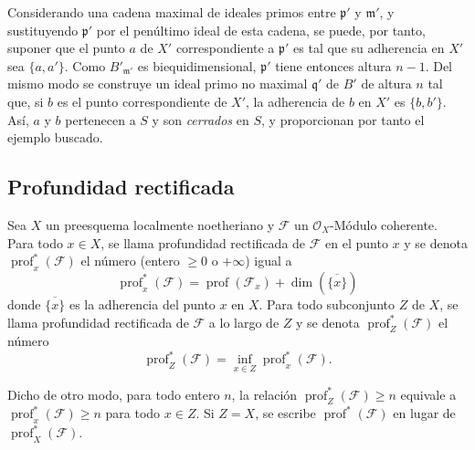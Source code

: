 \begin{env}[10.7.3]
Considerando una cadena maximal de ideales primos entre $\mathfrak p'$ y $\mathfrak m'$, y sustituyendo $\mathfrak p'$ por el penúltimo ideal de esta cadena, se puede, por tanto, suponer que el punto $a$ de $X'$ correspondiente a $\mathfrak p'$ es tal que su adherencia en $X'$ sea $\{a,a'\}$.
Como $B'_{\mathfrak m'}$ es biequidimensional, $\mathfrak p'$ tiene entonces altura $n-1$.
Del mismo modo se construye un ideal primo no maximal $\mathfrak q'$ de $B'$ de altura $n$ tal que, si $b$ es el punto correspondiente de $X'$, la adherencia de $b$ en $X'$ es $\{b,b'\}$.
Así, $a$ y $b$ pertenecen a $S$ y son \emph{cerrados} en $S$, y proporcionan por tanto el ejemplo buscado.
\end{env}

\subsection{Profundidad rectificada}
\label{subsection:IV.10.8}

\begin{definition}[10.8.1]
\label{IV.10.8.1}
Sea $X$ un preesquema localmente noetheriano y $\mathcal F$ un $\mathcal O_X$-Módulo coherente.
Para todo $x\in X$, se llama profundidad rectificada de $\mathcal F$ en el punto $x$ y se denota $\operatorname{prof}^{*}_{x}(\mathcal F)$ el número (entero $\geq0$ o $+\infty$) igual a
\begin{equation}
\label{IV.10.8.1.1-fr}
\tag{10.8.1.1}
\operatorname{prof}^{*}_{x}(\mathcal F)
=\operatorname{prof}(\mathcal F_x)+\dim(\overline{\{x\}})
\end{equation}
donde $\overline{\{x\}}$ es la adherencia del punto $x$ en $X$.
Para todo subconjunto $Z$ de $X$, se llama profundidad rectificada de $\mathcal F$ a lo largo de $Z$ y se denota $\operatorname{prof}^{*}_{Z}(\mathcal F)$ el número
\begin{equation}
\label{IV.10.8.1.2-fr}
\tag{10.8.1.2}
\operatorname{prof}^{*}_{Z}(\mathcal F)
=\inf_{x\in Z}\operatorname{prof}^{*}_{x}(\mathcal F).
\end{equation}
\end{definition}

Dicho de otro modo, para todo entero $n$, la relación $\operatorname{prof}^{*}_{Z}(\mathcal F)\geq n$ equivale a $\operatorname{prof}^{*}_{x}(\mathcal F)\geq n$ para todo $x\in Z$.
Si $Z=X$, se escribe $\operatorname{prof}^{*}(\mathcal F)$ en lugar de $\operatorname{prof}^{*}_{X}(\mathcal F)$.


